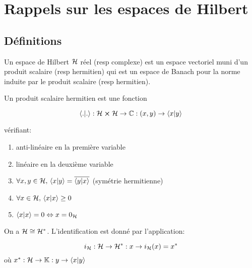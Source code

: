 \section{Rappels sur les espaces de Hilbert}

\subsection{Définitions}

\begin{definition}
	Un espace de Hilbert $\mathcal{H}$ réel (resp complexe) est un espace vectoriel
	muni d'un produit scalaire (resp hermitien) qui est un espace de Banach
	pour la norme induite par le produit scalaire (resp hermitien).
\end{definition}

\begin{definition}
	Un produit scalaire hermitien est une fonction
	
	\begin{equation}
		\bra{.}\ket{.} : \mathcal{H} \cross
		\mathcal{H} \rightarrow \mathbb{C} :
		(x, y) \rightarrow \bra{x}\ket{y}
	\end{equation}

	vérifiant:

	\begin{enumerate}
		\item anti-linéaire en la première variable
		\item linéaire en la deuxième variable
		\item $\forall x, y \in \mathcal{H}, \, \bra{x}\ket{y} =
			\overline{\bra{y}\ket{x}}$ (symétrie hermitienne)
		\item $\forall x \in \mathcal{H}, \, \bra{x}\ket{x} \geq 0$
		\item $\bra{x}\ket{x} = 0 \Leftrightarrow x = 0_{\mathcal{H}}$
	\end{enumerate}
\end{definition}

\begin{theorem} 
	\label{thm:repr_riesz}
	On a $\mathcal{H} \cong \mathcal{H}^{*}$.
	L'identification est donné par l'application:

	\begin{equation}
		i_{\mathcal{H}} : \mathcal{H} \rightarrow \mathcal{H}^{*} : x \rightarrow
		i_{\mathcal{H}}(x) = x^{*}
	\end{equation}
	où $x^{*} : \mathcal{H} \rightarrow \mathbb{K} : y \rightarrow
	\bra{x}\ket{y}$
\end{theorem}

